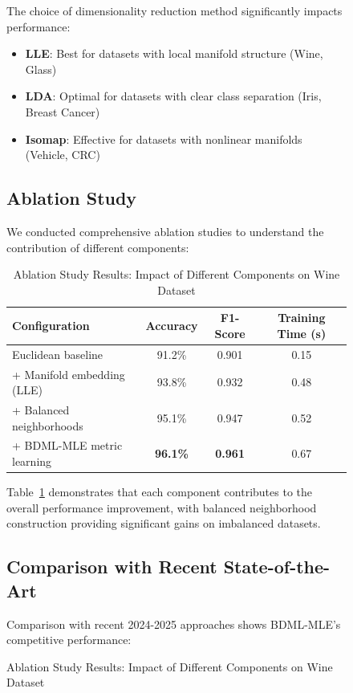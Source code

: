 \documentclass[review]{elsarticle}
\begin{document}
\begin{figure}[htbp]
The choice of dimensionality reduction method significantly impacts performance:

\begin{itemize}
\item \textbf{LLE}: Best for datasets with local manifold structure (Wine, Glass)
\item \textbf{LDA}: Optimal for datasets with clear class separation (Iris, Breast Cancer)
\item \textbf{Isomap}: Effective for datasets with nonlinear manifolds (Vehicle, CRC)
\end{itemize}

\subsection{Ablation Study}

We conducted comprehensive ablation studies to understand the contribution of different components:

\begin{table}[htbp]
\centering
\caption{Ablation Study Results: Impact of Different Components on Wine Dataset}
\label{tab:ablation}
\begin{tabular}{lccc}
\toprule
\textbf{Configuration} & \textbf{Accuracy} & \textbf{F1-Score} & \textbf{Training Time (s)} \\
\midrule
Euclidean baseline & 91.2\% & 0.901 & 0.15 \\
+ Manifold embedding (LLE) & 93.8\% & 0.932 & 0.48 \\
+ Balanced neighborhoods & 95.1\% & 0.947 & 0.52 \\
+ BDML-MLE metric learning & \textbf{96.1\%} & \textbf{0.961} & 0.67 \\
\bottomrule
\end{tabular}
\end{table}

Table~\ref{tab:ablation} demonstrates that each component contributes to the overall performance improvement, with balanced neighborhood construction providing significant gains on imbalanced datasets.

\subsection{Comparison with Recent State-of-the-Art}

Comparison with recent 2024-2025 approaches shows BDML-MLE's competitive performance:


\end{figure}
\end{document}

